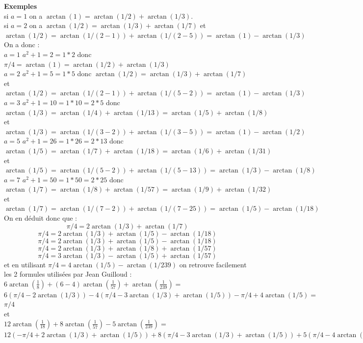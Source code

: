 \documentclass[a4paper,11pt]{book}
\begin{document}
{\bf Exemples}\\
si $a=1$ on a $\arctan(1)=\arctan(1/2)+\arctan(1/3)$.\\
si $a=2$ on a $\arctan(1/2)=\arctan(1/3)+\arctan(1/7)$ et\\
$\arctan(1/2)=\arctan(1/(2-1))+\arctan(1/(2-5))=\arctan(1)-\arctan(1/3)$
On a donc :\\
$a=1$ $a^2+1=2=1*2$ donc $\pi/4=\arctan(1)=\arctan(1/2)+\arctan(1/3)$\\
$a=2$ $a^2+1=5=1*5$ donc $\arctan(1/2)=\arctan(1/3)+\arctan(1/7)$ et\\
$\arctan(1/2)=\arctan(1/(2-1))+\arctan(1/(5-2))=\arctan(1)-\arctan(1/3)$
$a=3$ $a^2+1=10=1*10=2*5$ donc $\arctan(1/3)=\arctan(1/4)+\arctan(1/13)=\arctan(1/5)+\arctan(1/8)$ et
$\arctan(1/3)=\arctan(1/(3-2))+\arctan(1/(3-5))=\arctan(1)-\arctan(1/2)$\\
$a=5$ $a^2+1=26=1*26=2*13$ donc $\arctan(1/5)=\arctan(1/7)+\arctan(1/18)=\arctan(1/6)+\arctan(1/31)$ et\\
$\arctan(1/5)=\arctan(1/(5-2))+\arctan(1/(5-13))=\arctan(1/3)-\arctan(1/8)$
$a=7$ $a^2+1=50=1*50=2*25$ donc $\arctan(1/7)=\arctan(1/8)+\arctan(1/57)=\arctan(1/9)+\arctan(1/32)$ et \\
$\arctan(1/7)=\arctan(1/(7-2))+\arctan(1/(7-25))=\arctan(1/5)-\arctan(1/18)$\\

On en d\'eduit donc que :
$$\pi/4=2\arctan(1/3)+\arctan(1/7)$$
$$\pi/4=2\arctan(1/3)+\arctan(1/5)-\arctan(1/18)$$
$$\pi/4=2\arctan(1/3)+\arctan(1/5)-\arctan(1/18)$$
$$\pi/4=2\arctan(1/3)+\arctan(1/8)+\arctan(1/57)$$
$$\pi/4=3\arctan(1/3)-\arctan(1/5)+\arctan(1/57)$$
et en utilisant $\pi/4=4\arctan(1/5)-\arctan(1/239)$  on retrouve facilement 
les 2 formules utilis\'ees par Jean Guilloud :\\
$6\arctan(\frac{1}{8})+(6-4)\arctan(\frac{1}{57})+\arctan(\frac{1}{239})=$\\
$6(\pi/4-2\arctan(1/3))-4(\pi/4-3\arctan(1/3)+\arctan(1/5))-\pi/4+4\arctan(1/5)=$\\
$\pi/4$ \\
et\\
$12\arctan(\frac{1}{18})+8\arctan(\frac{1}{57})-5\arctan(\frac{1}{239})=$\\
$12(-\pi/4+2\arctan(1/3)+\arctan(1/5))+8(\pi/4-3\arctan(1/3)+\arctan(1/5))+5(\pi/4-4\arctan(1/5))=\pi/4$
\end{document}
